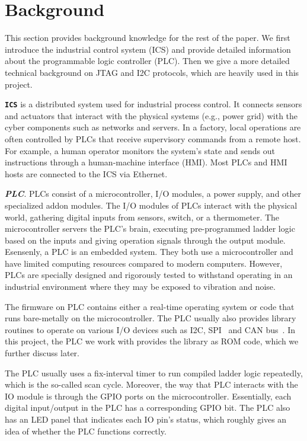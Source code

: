 \section{Background}
\label{sec:implant-background}

This section provides background knowledge for the rest of the paper. We first introduce the industrial control system (ICS) and provide detailed information about the programmable logic controller (PLC). Then we give a more detailed technical background on JTAG and I2C protocols, which are heavily used in this project.

\textbf{\texttt{ICS}} is a distributed system used for industrial process control. It connects sensors and actuators that interact with the physical systems (e.g., power grid) with the cyber components such as networks and servers. In a factory, local operations are often controlled by PLCs that receive supervisory commands from a remote host. For example, a human operator monitors the system's state and sends out instructions through a human-machine interface (HMI). Most PLCs and HMI hosts are connected to the ICS via Ethernet.

\textbf{\textit{PLC}}. PLCs consist of a microcontroller, I/O modules, a power supply, and other specialized addon modules. The I/O modules of PLCs interact with the physical world, gathering digital inputs from sensors, switch, or a thermometer. The microcontroller servers the PLC's brain, executing pre-programmed ladder logic based on the inputs and giving operation signals through the output module. Esensenly, a PLC is an embedded system. They both use a microcontroller and have limited computing resources compared to modern computers. However, PLCs are specially designed and rigorously tested to withstand operating in an industrial environment where they may be exposed to vibration and noise.

The firmware on PLC contains either a real-time operating system or code that runs bare-metally on the microcontroller. The PLC usually also provides library routines to operate on various I/O devices such as I2C, SPI~\cite{leens2009introduction} and CAN bus~\cite{bozdal2018survey}. In this project, the PLC we work with provides the library as ROM code, which we further discuss later. 

The PLC usually uses a fix-interval timer to run compiled ladder logic repeatedly, which is the so-called scan cycle. Moreover, the way that PLC interacts with the IO module is through the GPIO ports on the microcontroller. Essentially, each digital input/output in the PLC has a corresponding GPIO bit. The PLC also has an LED panel that indicates each IO pin's status, which roughly gives an idea of whether the PLC functions correctly.


